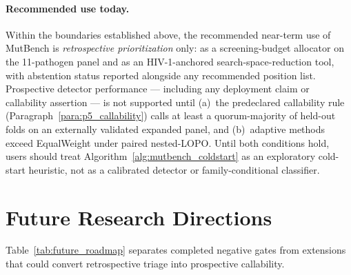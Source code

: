 \paragraph{Recommended use today.}
Within the boundaries established above, the recommended near-term use of MutBench is \emph{retrospective prioritization} only: as a screening-budget allocator on the 11-pathogen panel and as an HIV-1-anchored search-space-reduction tool, with abstention status reported alongside any recommended position list. Prospective detector performance --- including any deployment claim or callability assertion --- is not supported until (a)~the predeclared callability rule (Paragraph~\ref{para:p5_callability}) calls at least a quorum-majority of held-out folds on an externally validated expanded panel, and (b)~adaptive methods exceed EqualWeight under paired nested-LOPO. Until both conditions hold, users should treat Algorithm~\ref{alg:mutbench_coldstart} as an exploratory cold-start heuristic, not as a calibrated detector or family-conditional classifier.

\section{Future Research Directions}
\label{sec:future_work}

Table~\ref{tab:future_roadmap} separates completed negative gates from extensions that could convert retrospective triage into prospective callability.

\begin{table}[htbp]
\centering
\caption{Prioritized future research roadmap with current status}
\label{tab:future_roadmap}
\small
{}
\end{table}

